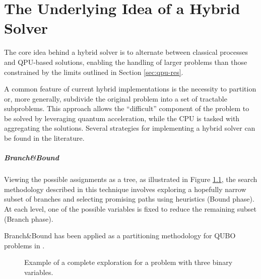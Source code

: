 \chapter{The Underlying Idea of a Hybrid Solver}

The core idea behind a hybrid solver is to alternate between classical processes and QPU-based solutions, enabling the handling of larger problems than those constrained by the limits outlined in Section \ref{sec:qpu-res}.

A common feature of current hybrid implementations is the necessity to partition or, more generally, subdivide the original problem into a set of tractable subproblems. 
This approach allows the ``difficult'' component of the problem to be solved by leveraging quantum acceleration, while the CPU is tasked with aggregating the solutions.
Several strategies for implementing a hybrid solver can be found in the literature.

\paragraph{Branch\&Bound} Viewing the possible assignments as a tree, as illustrated in Figure \ref{fig:assignment}, the search methodology described in this technique involves exploring a hopefully narrow subset of branches and selecting promising paths using heuristics (Bound phase). 
At each level, one of the possible variables is fixed to reduce the remaining subset (Branch phase).

Branch\&Bound has been applied as a partitioning methodology for QUBO problems in \cite{QBNB}.

\begin{figure}
    \centering
    \caption{Example of a complete exploration for a problem with three binary variables.}
    \label{fig:assignment}
\end{figure}

